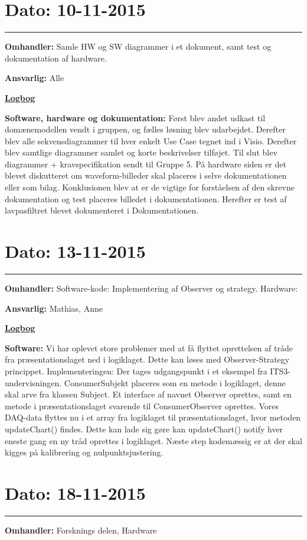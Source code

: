 \section{Dato: 10-11-2015}
\hrule
\textbf{Omhandler:} Samle HW og SW diagrammer i et dokument, samt test og dokumentation af hardware.

\textbf{Ansvarlig:} Alle

\underline{\textbf{Logbog}}

\textbf{Software, hardware og dokumentation: }Først blev andet udkast til domænemodellen vendt i gruppen, og fælles løsning blev udarbejdet. Derefter blev alle sekvensdiagrammer til hver enkelt Use Case tegnet ind i Visio. Derefter blev samtlige diagrammer samlet og korte beskrivelser tilføjet. Til slut blev diagrammer + kravspecifikation sendt til Gruppe 5. 
På hardware siden er det blevet diskutteret om waveform-billeder skal placeres i selve dokumentationen eller som bilag. Konklusionen blev at er de vigtige for forståelsen af den skrevne dokumentation og test placeres billedet i dokumentationen. Herefter er test af lavpasfiltret blevet dokumenteret i Dokumentationen.

\newpage
\section{Dato: 13-11-2015}
\hrule
\textbf{Omhandler:} Software-kode: Implementering af Observer og strategy. Hardware:  

\textbf{Ansvarlig:} Mathias, Anne

\underline{\textbf{Logbog}}

\textbf{Software: }Vi har oplevet store problemer med at få flyttet oprettelsen af tråde fra præsentationslaget ned i logiklaget. Dette kan løses med Observer-Strategy princippet. 
Implementeringen: Der tages udgangspunkt i et eksempel fra ITS3-undervisningen. ConsumerSubjekt placeres som en metode i logiklaget, denne skal arve fra klassen Subject. Et interface af navnet Observer oprettes, samt en metode i præsentationslaget svarende til ConsumerObserver oprettes. Vores DAQ-data flyttes nu i et array fra logiklaget til præsentationslaget, hvor metoden updateChart() findes. Dette kan lade sig gøre kan updateChart() notify hver eneste gang en ny tråd oprettes i logiklaget. 
Næste step kodemæssig er at der skal kigges på kalibrering og nulpunktsjustering.

\section{Dato: 18-11-2015}
\hrule
\textbf{Omhandler:} Forsknings delen, Hardware


